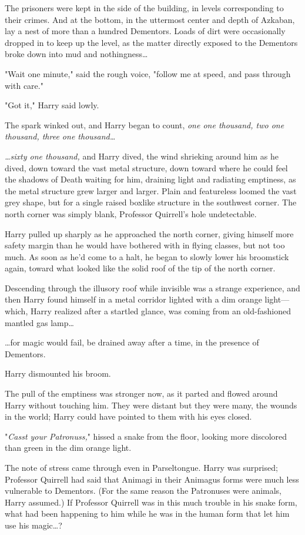 The prisoners were kept in the side of the building, in levels corresponding to 
their crimes. And at the bottom, in the uttermost center and depth of Azkaban, 
lay a nest of more than a hundred Dementors. Loads of dirt were occasionally 
dropped in to keep up the level, as the matter directly exposed to the 
Dementors broke down into mud and nothingness{\ldots}

"Wait one minute," said the rough voice, "follow me at speed, and pass through 
with care."

"Got it," Harry said lowly.

The spark winked out, and Harry began to count, \emph{one one thousand, two one 
thousand, three one thousand{\ldots}}

\emph{{\ldots}sixty one thousand,} and Harry dived, the wind shrieking around 
him as he dived, down toward the vast metal structure, down toward where he 
could feel the shadows of Death waiting for him, draining light and radiating 
emptiness, as the metal structure grew larger and larger. Plain and featureless 
loomed the vast grey shape, but for a single raised boxlike structure in the 
southwest corner. The north corner was simply blank, Professor Quirrell's hole 
undetectable.

Harry pulled up sharply as he approached the north corner, giving himself more 
safety margin than he would have bothered with in flying classes, but not too 
much. As soon as he'd come to a halt, he began to slowly lower his broomstick 
again, toward what looked like the solid roof of the tip of the north corner.

Descending through the illusory roof while invisible was a strange experience, 
and then Harry found himself in a metal corridor lighted with a dim orange 
light---which, Harry realized after a startled glance, was coming from an 
old-fashioned mantled gas lamp{\ldots}

{\ldots}for magic would fail, be drained away after a time, in the presence of 
Dementors.

Harry dismounted his broom.

The pull of the emptiness was stronger now, as it parted and flowed around 
Harry without touching him. They were distant but they were many, the wounds in 
the world; Harry could have pointed to them with his eyes closed.

"\emph{Casst your Patronuss,}" hissed a snake from the floor, looking more 
discolored than green in the dim orange light.

The note of stress came through even in Parseltongue. Harry was surprised; 
Professor Quirrell had said that Animagi in their Animagus forms were much less 
vulnerable to Dementors. (For the same reason the Patronuses were animals, 
Harry assumed.) If Professor Quirrell was in this much trouble in his snake 
form, what had been happening to him while he was in the human form that let 
him use his magic{\ldots}?

